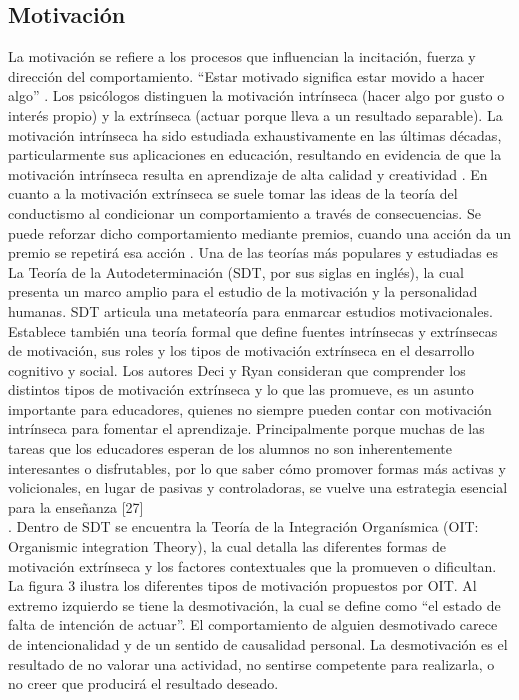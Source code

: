 \documentclass{article}
\begin{document}
\subsection{Motivación}
La motivación se refiere a los procesos que influencian la incitación, fuerza y dirección del comportamiento. “Estar motivado significa estar movido a hacer algo” \cite{ryan2000self}. Los psicólogos distinguen la motivación intrínseca (hacer algo por gusto o interés propio) y la extrínseca (actuar porque lleva a un resultado separable).
La motivación intrínseca ha sido estudiada exhaustivamente en las últimas décadas, particularmente sus aplicaciones en educación, resultando en evidencia de que la motivación intrínseca resulta en aprendizaje de alta calidad y creatividad \cite{albrecht2018relevance}.
En cuanto a la motivación extrínseca se suele tomar las ideas de la teoría del conductismo al condicionar un comportamiento a través de consecuencias. Se puede reforzar dicho comportamiento mediante premios, cuando una acción da un premio se repetirá esa acción \cite{escribano2010gamification}.
Una de las teorías más populares y estudiadas es La Teoría de la Autodeterminación (SDT, por sus siglas en inglés), la cual presenta un marco amplio  para el estudio de la motivación y la personalidad humanas. SDT articula una metateoría para enmarcar estudios motivacionales. Establece también una teoría formal que define fuentes intrínsecas y extrínsecas de motivación, sus roles y los  tipos de motivación extrínseca en el desarrollo cognitivo y social. Los autores Deci y Ryan consideran que comprender los distintos tipos de motivación extrínseca y lo que las promueve, es un asunto importante para educadores, quienes no siempre pueden contar con motivación intrínseca para fomentar el aprendizaje. Principalmente porque muchas de las tareas que los educadores esperan de los alumnos no son inherentemente interesantes o disfrutables, por lo que saber cómo promover formas más activas y volicionales, en lugar de pasivas y controladoras, se vuelve una estrategia esencial para la enseñanza [27]\\.
Dentro de SDT se encuentra la Teoría de la Integración Organísmica (OIT: Organismic integration Theory), la cual detalla las diferentes formas de motivación extrínseca y los factores contextuales que la promueven o dificultan.\\      
         
La figura 3 ilustra los diferentes tipos de motivación propuestos por OIT. Al extremo izquierdo se tiene la desmotivación, la cual se define como “el estado de falta de intención de actuar”. El comportamiento de alguien desmotivado carece de intencionalidad y de un sentido de causalidad personal. La desmotivación es el resultado de no valorar una actividad, no sentirse competente para realizarla, o no creer que producirá el resultado deseado.\\
\end{document}

